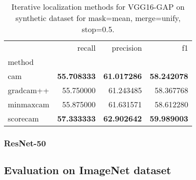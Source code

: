 \begin{table}[ht]
\centering
\begin{tabular}{lrrr}
\toprule
 & recall & precision & f1 \\
method &  &  &  \\
\cmidrule(lr){1-1} \cmidrule(lr){2-4}
cam & \color{purple} \bfseries 55.708333 & \color{purple} \bfseries 61.017286 & \color{purple} \bfseries 58.242078 \\
gradcam++ & 55.750000 & 61.243485 & 58.367768 \\
minmaxcam & 55.875000 & 61.631571 & 58.612280 \\
scorecam & \color{teal} \bfseries 57.333333 & \color{teal} \bfseries 62.902642 & \color{teal} \bfseries 59.989003 \\
\bottomrule
\end{tabular}
\caption[Iterative localization methods for VGG16-GAP on synthetic dataset]{Iterative localization methods for VGG16-GAP on synthetic dataset for mask=mean, merge=unify, stop=0.5.}
\label{tab:iter_metrics_vgg16_cam_synthetic_all}
\end{table}

\subsubsection{ResNet-50}

\subsection{Evaluation on ImageNet dataset}

